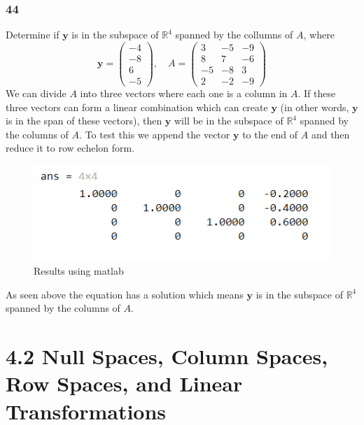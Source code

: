     \subsubsection*{44}
    Determine if $ \mathbf y $ is in the subspace of $ \mathbb R^{4} $ spanned by the collumns of $ A $, where
    \[
    \mathbf y = 
    \begin{pmatrix}
       -4  \\ 
       -8  \\ 
       6  \\
       -5  
    \end{pmatrix}, \quad
    A = \begin{pmatrix}
      3 & -5 & -9 \\ 
      8 & 7 & -6 \\ 
      -5 & -8 & 3 \\ 
      2 & -2 & -9
    \end{pmatrix}
    \]
    \newline \newline 
    We can divide $ A $ into three vectors where each one is a column in $ A $. If these three vectors can form a linear combination which can create $ \mathbf y $ (in other words, $ \mathbf y $ is in the span of these vectors), then $ \mathbf y $ will be in the subspace of $ \mathbb R^{4}$ spanned by the columns of $ A $. To test this we append the vector $ \mathbf y $ to the end of $ A $ and then reduce it to row echelon form. 
    \begin{figure}[h!]
      \centering
      \includegraphics[scale = .7]{Bilder/Exercise_44_matlab.png}
      \caption{Results using matlab}
      \label{fig:figure1}
    \end{figure}
    As seen above the equation has a solution which means $ \mathbf  y $ is in the subspace of $ \mathbb R^{4}$ spanned by the columns of $ A $.

\section*{4.2 Null Spaces, Column Spaces, Row Spaces, and Linear Transformations}
